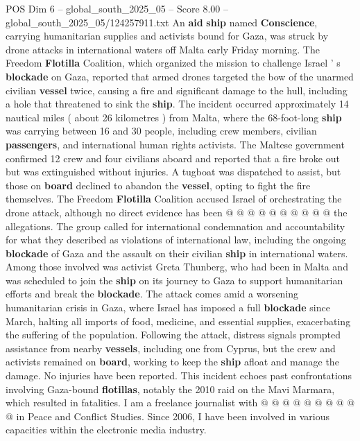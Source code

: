\begin{textsample}{POS Dim 6 – global\_south\_2025\_05 – Score 8.00 – global\_south\_2025\_05/124257911.txt}  \label{ex:f6_pos_056}
An \textbf{aid} \textbf{ship} named \textbf{Conscience}, carrying humanitarian supplies and activists bound for Gaza, was struck by drone attacks in international waters off Malta early Friday morning.
The Freedom \textbf{Flotilla} Coalition, which organized the mission to challenge Israel ' s \textbf{blockade} on Gaza, reported that armed drones targeted the bow of the unarmed civilian \textbf{vessel} twice, causing a fire and significant damage to the hull, including a hole that threatened to sink the \textbf{ship}.
The incident occurred approximately 14 nautical miles ( about 26 kilometres ) from Malta, where the 68-foot-long \textbf{ship} was carrying between 16 and 30 people, including crew members, civilian \textbf{passengers}, and international human rights activists.
The Maltese government confirmed 12 crew and four civilians aboard and reported that a fire broke out but was extinguished without injuries.
A tugboat was dispatched to assist, but those on \textbf{board} declined to abandon the \textbf{vessel}, opting to fight the fire themselves.
The Freedom \textbf{Flotilla} Coalition accused Israel of orchestrating the drone attack, although no direct evidence has been @ @ @ @ @ @ @ @ @ @ the allegations.
The group called for international condemnation and accountability for what they described as violations of international law, including the ongoing \textbf{blockade} of Gaza and the assault on their civilian \textbf{ship} in international waters.
Among those involved was activist Greta Thunberg, who had been in Malta and was scheduled to join the \textbf{ship} on its journey to Gaza to support humanitarian efforts and break the \textbf{blockade}.
The attack comes amid a worsening humanitarian crisis in Gaza, where Israel has imposed a full \textbf{blockade} since March, halting all imports of food, medicine, and essential supplies, exacerbating the suffering of the population.
Following the attack, distress signals prompted assistance from nearby \textbf{vessels}, including one from Cyprus, but the crew and activists remained on \textbf{board}, working to keep the \textbf{ship} afloat and manage the damage.
No injuries have been reported.
This incident echoes past confrontations involving Gaza-bound \textbf{flotillas}, notably the 2010 raid on the Mavi Marmara, which resulted in fatalities.
I am a freelance journalist with @ @ @ @ @ @ @ @ @ @ in Peace and Conflict Studies.
Since 2006, I have been involved in various capacities within the electronic media industry.

\end{textsample}
